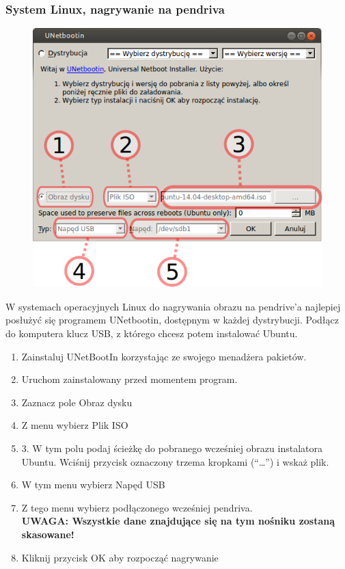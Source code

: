 \subsubsection{System Linux, nagrywanie na pendriva}
\begin{figure}
                \includegraphics[width=\linewidth]{images/instalacja_nagrywanie_obrazu_linux.png}
\end{figure}
W systemach operacyjnych Linux do nagrywania obrazu na pendrive'a najlepiej posłużyć się programem UNetbootin, dostępnym w każdej dystrybucji. Podłącz do komputera klucz USB, z którego chcesz potem instalować Ubuntu.
\begin{enumerate}
\item Zainstaluj UNetBootIn korzystając ze swojego menadżera pakietów.
\item Uruchom zainstalowany przed momentem program.
\item Zaznacz pole Obraz dysku
\item Z menu wybierz Plik ISO
\item 3. W tym polu podaj ścieżkę do pobranego wcześniej obrazu instalatora Ubuntu. Wciśnij przycisk oznaczony trzema kropkami (“\ldots”) i wskaż plik.
\item W tym menu wybierz Napęd USB
\item Z tego menu wybierz podłączonego wcześniej pendriva.\\
\textbf{UWAGA: Wszystkie dane znajdujące się na tym nośniku zostaną skasowane!}
\item Kliknij przycisk OK aby rozpocząć nagrywanie
\end{enumerate}
\clearpage
